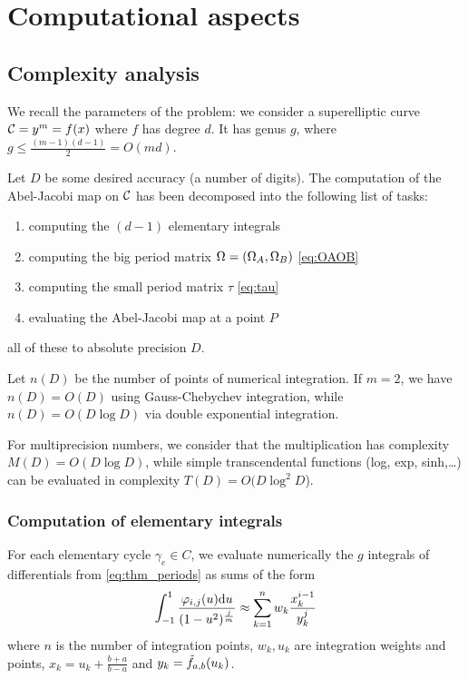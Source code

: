 \documentclass[main.tex]{subfiles}
\begin{document}
  \section{Computational aspects}

   \subsection{Complexity analysis}

   We recall the parameters of the problem: we consider a superelliptic curve
   $\mathcal{C}=y^m=f(x)$ where $f$ has degree $d$. It has genus $g$, where
   $g\leq \frac{(m-1)(d-1)}2=O(md)$.

   Let $D$ be some desired accuracy (a number of digits). The computation of
   the Abel-Jacobi map on $\mathcal{C}$ has been decomposed into the
   following list of tasks:
   \begin{enumerate}
       \item computing the $(d-1)$ elementary integrals
       \item computing the big period matrix $\Omega=(\Omega_A,\Omega_B)$ \eqref{eq:OAOB}
       \item computing the small period matrix $\tau$ \eqref{eq:tau}
       \item evaluating the Abel-Jacobi map at a point $P$
   \end{enumerate}
   all of these to absolute precision $D$.

   Let $n(D)$ be the number of points of numerical integration.
   If $m=2$, we have
   $n(D)=O(D)$ using Gauss-Chebychev integration, while $n(D)=O(D\log D)$
   via double exponential integration.

   For multiprecision numbers, we consider that the multiplication has
   complexity $M(D)=O(D\log D)$,
   while simple transcendental functions (log, exp, sinh,\dots) can be evaluated
   in complexity $T(D)=O(D\log^2 D$).

   \subsubsection{Computation of elementary integrals}

   For each elementary cycle $\gamma_e\in C$, we evaluate numerically the $g$
   integrals of differentials from \eqref{eq:thm_periods} as sums of the form
   \begin{equation}
       \int_{-1}^1\frac{\varphi_{i,j}(u)\mathrm d u}{(1-u^2)^{\frac jm}}
           \approx \sum_{k=1}^n w_k\frac{x_k^{i-1}}{y_k^j}
   \end{equation}
   where $n$ is the number of integration points, $w_k,u_k$ are integration weights and points,
   $x_k=u_k+\frac{b+a}{b-a}$ and $y_k=\tilde{f}_{a,b}(u_k)$.
\end{document}
